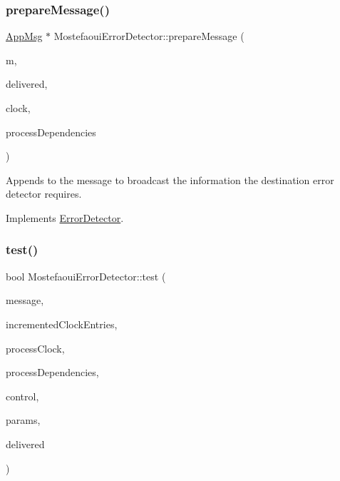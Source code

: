 \subsubsection{\texorpdfstring{prepare\+Message()}{prepareMessage()}}
{\footnotesize\ttfamily \hyperlink{class_app_msg}{App\+Msg} $\ast$ Mostefaoui\+Error\+Detector\+::prepare\+Message (\begin{DoxyParamCaption}\item[{\hyperlink{class_app_msg}{App\+Msg} $\ast$}]{m,  }\item[{const vector$<$ \hyperlink{structures_8h_a7e7bdc1d2fff8a9436f2f352b2711ed6}{message\+Info} $>$ \&}]{delivered,  }\item[{const \hyperlink{class_probabilistic_clock}{Probabilistic\+Clock} \&}]{clock,  }\item[{const \hyperlink{class_total_dependencies}{Total\+Dependencies} \&}]{process\+Dependencies }\end{DoxyParamCaption})\hspace{0.3cm}{\ttfamily [virtual]}}



Appends to the message to broadcast the information the destination error detector requires. 



Implements \hyperlink{class_error_detector_a8cac1f6ac6803da4379df7891789c490}{Error\+Detector}.

\mbox{\label{class_mostefaoui_error_detector_a293f6cf144526bc8694fc4f1fc0daeb5}} 
\subsubsection{\texorpdfstring{test()}{test()}}
{\footnotesize\ttfamily bool Mostefaoui\+Error\+Detector\+::test (\begin{DoxyParamCaption}\item[{\hyperlink{structures_8h_a7e7bdc1d2fff8a9436f2f352b2711ed6}{message\+Info}}]{message,  }\item[{const vector$<$ unsigned int $>$ \&}]{incremented\+Clock\+Entries,  }\item[{const \hyperlink{class_probabilistic_clock}{Probabilistic\+Clock} \&}]{process\+Clock,  }\item[{const \hyperlink{class_total_dependencies}{Total\+Dependencies} \&}]{process\+Dependencies,  }\item[{\hyperlink{class_controller}{Controller} $\ast$}]{control,  }\item[{\hyperlink{class_simulation_parameters}{Simulation\+Parameters} $\ast$}]{params,  }\item[{const vector$<$ \hyperlink{structures_8h_a7e7bdc1d2fff8a9436f2f352b2711ed6}{message\+Info} $>$ \&}]{delivered }\end{DoxyParamCaption})\hspace{0.3cm}{\ttfamily [virtual]}}



